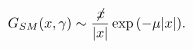 \begin{equation}
G_{SM}(x,\gamma)\sim \frac{\not\! x}{|x|} \exp {(-\mu |x|)}.
\label{asyinv}
\end{equation}

